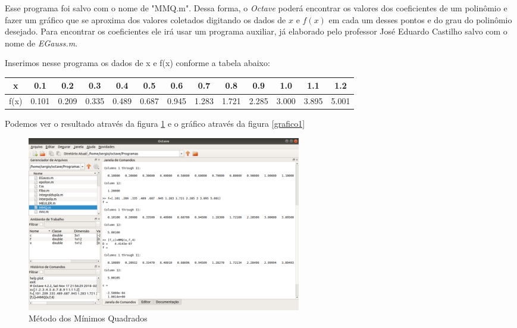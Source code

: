 \documentclass[11pt, openright, a4paper, brazil, openany, oneside]{abntex2}
\begin{document}
Esse programa foi salvo com o nome de "MMQ.m". Dessa forma, o \textit{Octave} poderá encontrar os valores dos coeficientes de um polinômio e fazer um gráfico que se aproxima dos valores coletados digitando os dados de $x$ e $f(x)$ em cada um desses pontos e do grau do polinômio desejado. Para encontrar os coeficientes ele irá usar um programa auxiliar, já elaborado pelo professor José Eduardo Castilho salvo com o nome de \textit{EGauss.m}.

Inserimos nesse programa os dados de x e f(x) conforme a tabela abaixo:

\begin{table}[ht]
\centering
\begin{tabular}{|c|c|c|c|c|c|c|c|c|c|c|c|c|}
\hline
x & 0.1 & 0.2 & 0.3 & 0.4 & 0.5 & 0.6 & 0.7 & 0.8 & 0.9 & 1.0 & 1.1 & 1.2 \\ 
\hline
f(x) & 0.101 & 0.209 & 0.335 & 0.489 & 0.687 & 0.945 & 1.283 & 1.721 & 2.285 & 3.000 & 3.895 & 5.001\\ 
\hline

\end{tabular}
\end{table}

Podemos ver o resultado através da figura \ref{octave1} e o gráfico através da figura \ref{grafico1}

\begin{figure}[ht]

    \center

    \includegraphics[width=12cm]{octave1.png}
    \caption{Método dos Mínimos Quadrados \label{octave1}}
    
\end{figure}
\end{document}

